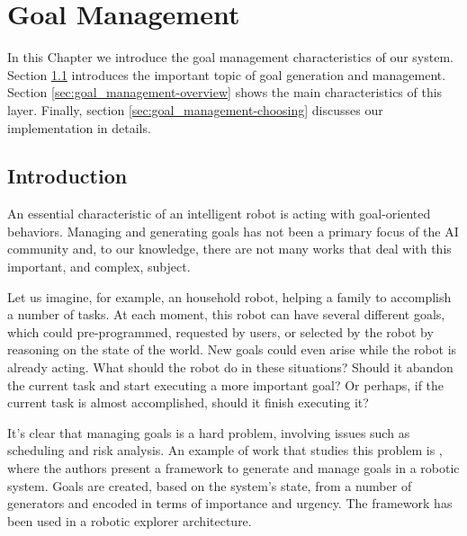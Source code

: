 
\chapter{Goal Management} %

\label{chapter:goal_management} %

In this Chapter we introduce the goal management characteristics of our system. Section \ref{sec:goal_management-intro} introduces the important topic of goal generation and management. Section \ref{sec:goal_management-overview} shows the main characteristics of this layer. Finally, section \ref{sec:goal_management-choosing} discusses our implementation in details.

\section{Introduction}
\label{sec:goal_management-intro}
An essential characteristic of an intelligent robot is acting with goal-oriented behaviors. Managing and generating goals has not been a primary focus of the AI community and, to our knowledge, there are not many works that deal with this important, and complex, subject. 

Let us imagine, for example, an household robot, helping a family to accomplish a number of tasks. At each moment, this robot can have several different goals, which could pre-programmed, requested by users, or selected by the robot by reasoning on the state of the world. New goals could even arise while the robot is already acting. What should the robot do in these situations? Should it abandon the current task and start executing a more important goal? Or perhaps, if the current task is almost accomplished, should it finish executing it?  

It's clear that managing goals is a hard problem, involving issues such as scheduling and risk analysis. An example of work that studies this problem is \cite{hanheide2010framework}, where the authors present a framework to generate and manage goals in a robotic system. Goals are created, based on the system's state, from a number of generators and encoded in terms of importance and urgency. The framework has been used in a robotic explorer architecture.


